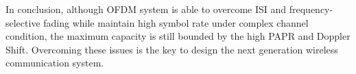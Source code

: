 In conclusion, although OFDM system is able to overcome ISI and frequency-selective fading while maintain high symbol rate under complex channel condition, the maximum capacity is still bounded by the high PAPR and Doppler Shift. Overcoming these issues is the key to design the next generation wireless communication system.

